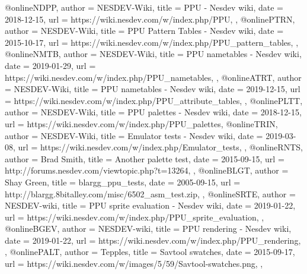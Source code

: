 @online{NDPP,
	author = {NESDEV-Wiki},
	title = {PPU - Nesdev wiki},
	date = {2018-12-15},
	url = {https://wiki.nesdev.com/w/index.php/PPU},
},
@online{PTRN,
	author = {NESDEV-Wiki},
	title = {PPU Pattern Tables - Nesdev wiki},
	date = {2015-10-17},
	url = {https://wiki.nesdev.com/w/index.php/PPU_pattern_tables},
},
@online{NMTB,
	author = {NESDEV-Wiki},
	title = {PPU nametables - Nesdev wiki},
	date = {2019-01-29},
	url = {https://wiki.nesdev.com/w/index.php/PPU_nametables},
},
@online{ATRT,
	author = {NESDEV-Wiki},
	title = {PPU nametables - Nesdev wiki},
	date = {2019-12-15},
	url = {https://wiki.nesdev.com/w/index.php/PPU_attribute_tables},
},
@online{PLTT,
	author = {NESDEV-Wiki},
	title = {PPU palettes - Nesdev wiki},
	date = {2018-12-15},
	url = {https://wiki.nesdev.com/w/index.php/PPU_palettes},
}
@online{TRIN,
	author = {NESDEV-Wiki},
	title = {Emulator tests - Nesdev wiki},
	date = {2019-03-08},
	url = {https://wiki.nesdev.com/w/index.php/Emulator_tests},
},
@online{RNTS,
	author = {Brad Smith},
	title = {Another palette test},
	date = {2015-09-15},
	url = {http://forums.nesdev.com/viewtopic.php?t=13264},
},
@online{BLGT,
	author = {Shay Green},
	title = {blargg\_ppu\_tests},
	date = {2005-09-15},
	url = {http://blargg.8bitalley.com/misc/6502_asm_test.zip},
},
@online{SRTE,
	author = {NESDEV-wiki},
	title = {PPU sprite evaluation - Nesdev wiki},
	date = {2019-01-22},
	url = {https://wiki.nesdev.com/w/index.php/PPU_sprite_evaluation},
},
@online{BGEV,
	author = {NESDEV-wiki},
	title = {PPU rendering - Nesdev wiki},
	date = {2019-01-22},
	url = {https://wiki.nesdev.com/w/index.php/PPU_rendering},
},
@online{PALT,
	author = {Tepples},
	title = {Savtool swatches},
	date = {2015-09-17},
	url = {https://wiki.nesdev.com/w/images/5/59/Savtool-swatches.png},
},

